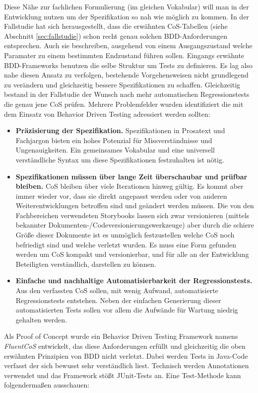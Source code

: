 Diese Nähe zur fachlichen Formulierung (im gleichen Vokabular) will man in der Entwicklung nutzen um der Spezifikation so nah wie möglich zu kommen. In der Fallstudie hat sich herausgestellt, dass die erwähnten CoS-Tabellen (siehe Abschnitt \ref{sec:fallstudie}) schon recht genau solchen \Gls{BDD}-Anforderungen entsprechen. Auch sie beschreiben, ausgehend von einem Ausgangszustand welche Paramater zu einem bestimmten Endzustand führen sollen. Eingangs erwähnte \Gls{BDD}-Frameworks benutzen die selbe Struktur um Tests zu definieren. Es lag also nahe diesen Ansatz zu verfolgen, bestehende Vorgehensweisen nicht grundlegend zu verändern und gleichzeitig bessere Spezifikationen zu schaffen. Gleichzeitig bestand in der Fallstudie der Wunsch nach mehr automatischen Regressionstests die genau jene \Gls{CoS} prüfen. Mehrere Problemfelder wurden identifiziert die mit dem Einsatz von Behavior Driven Testing adressiert werden sollten:


\begin{itemize}
\item \textbf{Präzisierung der Spezifikation.} Spezifikationen in Prosatext und Fachjargon bieten ein hohes Potenzial für Missverständnisse und Ungenauigkeiten. Ein gemeinsames Vokabular und eine universell verständliche Syntax um diese Spezifikationen festzuhalten ist nötig.
\item \textbf{Spezifikationen müssen über lange Zeit überschaubar und prüfbar bleiben.} \Gls{CoS} bleiben über viele Iterationen hinweg gültig. Es kommt aber immer wieder vor, dass sie direkt angepasst werden oder von anderen Weiterentwicklungen betroffen sind und geändert werden müssen. Die von den Fachbereichen verwendeten Storybooks lassen sich zwar versionieren (mittels bekannter Dokumenten-/Codeversionierungswerkzeuge) aber durch die schiere Größe dieser Dokumente ist es unmöglich festzustellen welche CoS noch befriedigt sind und welche verletzt wurden. Es muss eine Form gefunden werden um CoS kompakt und versionierbar, und für alle an der Entwicklung Beteiligten verständlich, darstellen zu können.
\item \textbf{Einfache und nachhaltige Automatisierbarkeit der Regressionstests.} Aus den verfassten CoS sollen, mit wenig Aufwand, automatisierte Regressionstests entstehen. Neben der einfachen Generierung dieser automatisierten Tests sollen vor allem die Aufwände für Wartung niedrig gehalten werden.
\end{itemize}


Als Proof of Concept wurde ein Behavior Driven Testing Framework namens \textit{FluentCoS} entwickelt, das diese Anforderungen erfüllt und gleichzeitig die oben erwähnten Prinzipien von \Gls{BDD} nicht verletzt. Dabei werden Tests in Java-Code verfasst der sich bewusst sehr verständlich liest. Technisch werden Annotationen verwendet und das Framework stößt JUnit-Tests an. Eine Test-Methode kann folgendermaßen ausschauen:

